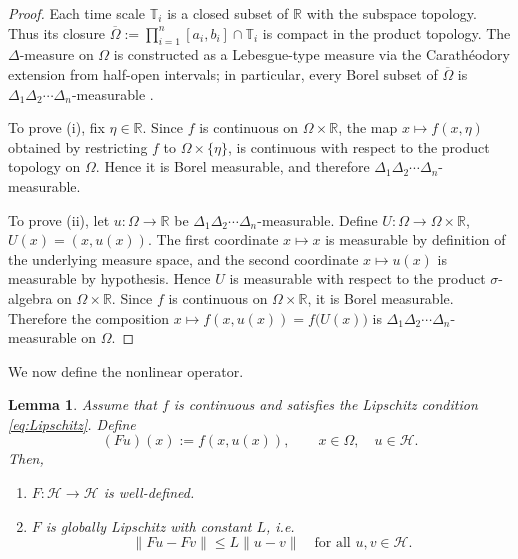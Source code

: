 \documentclass{article}
\newtheorem{lemma}[theorem]{Lemma}
\numberwithin{equation}{section}
\numberwithin{theorem}{section}
\begin{document}
\begin{proof}
Each time scale $\mathbb{T}_i$ is a closed subset of $\mathbb{R}$ with the subspace topology. Thus its closure $\overline{\Omega} := \displaystyle\prod_{i=1}^{n} [a_i,b_i]\cap\mathbb{T}_i$ is compact in the product topology. The $\Delta$-measure on $\Omega$ is constructed as a Lebesgue-type measure via the Carath\'eodory extension from half-open intervals; in particular, every Borel subset of $\overline{\Omega}$ is $\Delta_1\Delta_2\cdots\Delta_n$-measurable \cite{Bohner-Guseinov-Lebesgue}.

To prove (i), fix $\eta\in\mathbb{R}$. Since $f$ is continuous on $\Omega\times\mathbb{R}$, the map
$x \mapsto f(x,\eta)$
obtained by restricting $f$ to $\Omega\times\{\eta\}$, is continuous with respect to the product topology on $\Omega$. Hence it is Borel measurable, and therefore $\Delta_1\Delta_2\cdots\Delta_n$-measurable.

To prove (ii), let $u\colon\Omega\to\mathbb{R}$ be $\Delta_1\Delta_2\cdots\Delta_n$-measurable. Define
$U\colon\Omega\to\Omega\times\mathbb{R}$, $U(x) = (x,u(x)).$
The first coordinate $x\mapsto x$ is measurable by definition of the underlying measure space, and the second coordinate $x\mapsto u(x)$ is measurable by hypothesis. Hence $U$ is measurable with respect to the product $\sigma$-algebra on $\Omega\times\mathbb{R}$. Since $f$ is continuous on $\Omega\times\mathbb{R}$, it is Borel measurable. Therefore the composition
$x \mapsto f(x,u(x)) = f\bigl(U(x)\bigr)$
is $\Delta_1\Delta_2\cdots\Delta_n$-measurable on $\Omega$.
\end{proof}

We now define the nonlinear operator.

\begin{lemma}\label{lem:nemytskii-global}
Assume that $f$ is continuous and satisfies the Lipschitz condition \eqref{eq:Lipschitz}. Define
\[
(Fu)(x) := f(x,u(x)), \qquad x\in\Omega,\quad u\in \mathscr{H}.
\]
Then,
\begin{enumerate}
\item[(i)] $F\colon \mathscr{H}\to \mathscr{H}$ is well-defined.
\item[(ii)] $F$ is globally Lipschitz with constant $L$, i.e.
\begin{equation}\label{eq:F-Lipschitz-H-global}
\|Fu - Fv\| \le L \|u-v\| \quad \text{for all } u,v\in \mathscr{H}.
\end{equation}
\end{enumerate}
\end{lemma}
\end{document}
